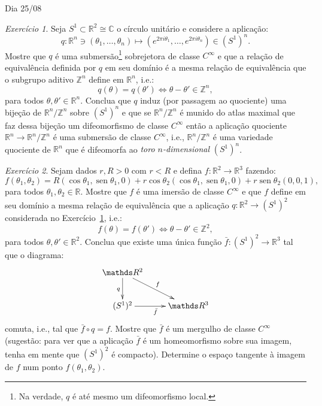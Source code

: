 \documentclass[oneside,11pt]{amsart}
\newcommand{\R}{\mathds R}
\newcommand{\C}{\mathds C}
\newcommand{\Z}{\mathds Z}
\DeclareMathOperator{\sen}{sen}
\theoremstyle{remark}\newtheorem{exercise}{Exercício}[section]
\theoremstyle{plain}\newtheorem{teo}{Teorema}[section]
\theoremstyle{plain}\newtheorem{lem}[teo]{Lema}
\theoremstyle{plain}\newtheorem{prop}[teo]{Proposição}
\theoremstyle{definition}\newtheorem{defin}[teo]{Definição}
\theoremstyle{remark}\newtheorem{rem}[teo]{Observação}
\theoremstyle{definition}\newtheorem{example}[teo]{Exemplo}
\numberwithin{equation}{section}
\begin{document}
\begin{section}{Dia 25/08}
\begin{exercise}\label{exe:toro}
Seja $S^1\subset\R^2\cong\C$ o círculo unitário e considere a aplicação:
\[q:\R^n\ni(\theta_1,\ldots,\theta_n)\longmapsto(e^{2\pi i\theta_1},\ldots,e^{2\pi i\theta_n})\in(S^1)^n.\]
Mostre que $q$ é uma submersão\footnote{%
Na verdade, $q$ é até mesmo um difeomorfismo local.}
sobrejetora de classe $C^\infty$ e que a relação de equivalência definida por $q$ em seu domínio é a mesma
relação de equivalência que o subgrupo aditivo $\Z^n$ define em $\R^n$, i.e.:
\[q(\theta)=q(\theta')\Longleftrightarrow\theta-\theta'\in\Z^n,\]
para todos $\theta,\theta'\in\R^n$. Conclua que $q$ induz (por passagem ao quociente) uma bijeção de $\R^n/\Z^n$ sobre $(S^1)^n$ e que se $\R^n/\Z^n$ é munido
do atlas maximal que faz dessa bijeção um difeomorfismo de classe $C^\infty$ então a aplicação quociente $\R^n\to\R^n/\Z^n$ é uma submersão de classe $C^\infty$, i.e.,
$\R^n/\Z^n$ é uma variedade quociente de $\R^n$ que é difeomorfa ao {\em toro $n$-dimensional\/} $(S^1)^n$.
\end{exercise}

\begin{exercise}
Sejam dados $r,R>0$ com $r<R$ e defina $f:\R^2\to\R^3$ fazendo:
\[f(\theta_1,\theta_2)=R(\cos\theta_1,\sen\theta_1,0)+r\cos\theta_2(\cos\theta_1,\sen\theta_1,0)+r\sen\theta_2(0,0,1),\]
para todos $\theta_1,\theta_2\in\R$. Mostre que $f$ é uma imersão de classe $C^\infty$ e que $f$ define em seu domínio a mesma relação de equivalência
que a aplicação $q:\R^2\to(S^1)^2$ considerada no Exercício~\ref{exe:toro}, i.e.:
\[f(\theta)=f(\theta')\Longleftrightarrow\theta-\theta'\in\Z^2,\]
para todos $\theta,\theta'\in\R^2$. Conclua que existe uma única função $\bar f:(S^1)^2\to\R^3$ tal que o diagrama:
\[\xymatrix{%
\R^2\ar[dr]^f\ar[d]_q\\
(S^1)^2\ar[r]_{\bar f}&\R^3}\]
comuta, i.e., tal que $\bar f\circ q=f$. Mostre que $\bar f$ é um mergulho de classe $C^\infty$ (sugestão: para ver que a aplicação $\bar f$ é um homeomorfismo sobre sua imagem, tenha
em mente que $(S^1)^2$ é compacto). Determine o espaço tangente à imagem de $f$ num ponto $f(\theta_1,\theta_2)$.
\end{exercise}


\end{section}
\end{document}
